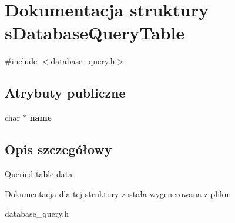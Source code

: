 \hypertarget{structsDatabaseQueryTable}{}\section{Dokumentacja struktury s\+Database\+Query\+Table}
\label{structsDatabaseQueryTable}


{\ttfamily \#include $<$database\+\_\+query.\+h$>$}

\subsection*{Atrybuty publiczne}
\begin{DoxyCompactItemize}
\item 
char $\ast$ {\bfseries name}\hypertarget{structsDatabaseQueryTable_a4a57512c1cc994cf4cc526e55e246146}{}\label{structsDatabaseQueryTable_a4a57512c1cc994cf4cc526e55e246146}

\end{DoxyCompactItemize}


\subsection{Opis szczegółowy}
Queried table data 

Dokumentacja dla tej struktury została wygenerowana z pliku\+:\begin{DoxyCompactItemize}
\item 
database\+\_\+query.\+h\end{DoxyCompactItemize}
